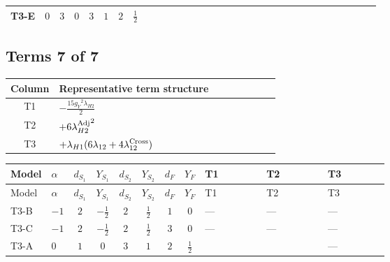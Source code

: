 \documentclass[8pt]{article}
\begin{document}
\begin{landscape}
\begin{longtable}{@{}llcccccc >{\raggedright\arraybackslash}p{0.21\linewidth} >{\raggedright\arraybackslash}p{0.21\linewidth} >{\raggedright\arraybackslash}p{0.21\linewidth}@{}}
\midrule
T3-E & $0$ & $3$ & $0$ & $3$ & $1$ & $2$ & $\frac{1}{2}$ & \scriptsize\adjustbox{max width=\linewidth}{$\begin{gathered} +6 {g_2}^4\end{gathered}$} & \scriptsize\adjustbox{max width=\linewidth}{$\begin{gathered} -\frac{33 {g_2}^2 {\lambda_{H2}}}{2}\end{gathered}$} & \scriptsize\adjustbox{max width=\linewidth}{$\begin{gathered} +3 {g_Y}^4\end{gathered}$} \\
\midrule
\bottomrule
\end{longtable}
\clearpage
\subsection*{Terms 7 of 7}
\begin{center}
\begin{tabular}{@{}c >{\raggedright\arraybackslash}p{0.82\linewidth}@{}}
\toprule
Column & Representative term structure \\
\midrule
T1 & \(\displaystyle -\frac{15 {g_Y}^2 {\lambda_{H2}}}{2}\) \\
\midrule
T2 & \(\displaystyle +6 {\lambda_{H2}^{\rm Adj}}^2\) \\
\midrule
T3 & \(\displaystyle +{\lambda_{H1}} (6 {\lambda_{12}}+4 {\lambda_{12}^{\rm Cross}})\) \\
\midrule
\bottomrule
\end{tabular}
\end{center}
\smallskip
\tiny
\begin{longtable}{@{}llcccccc >{\raggedright\arraybackslash}p{0.21\linewidth} >{\raggedright\arraybackslash}p{0.21\linewidth} >{\raggedright\arraybackslash}p{0.21\linewidth}@{}}
\toprule
Model & $\alpha$ & $d_{S_1}$ & $Y_{S_1}$ & $d_{S_2}$ & $Y_{S_2}$ & $d_F$ & $Y_F$ & T1 & T2 & T3 \\
\midrule
\endfirsthead
\toprule
Model & $\alpha$ & $d_{S_1}$ & $Y_{S_1}$ & $d_{S_2}$ & $Y_{S_2}$ & $d_F$ & $Y_F$ & T1 & T2 & T3 \\
\midrule
\endhead
T3-B & $-1$ & $2$ & $-\frac{1}{2}$ & $2$ & $\frac{1}{2}$ & $1$ & $0$ & --- & --- & --- \\
\midrule
T3-C & $-1$ & $2$ & $-\frac{1}{2}$ & $2$ & $\frac{1}{2}$ & $3$ & $0$ & --- & --- & --- \\
\midrule
T3-A & $0$ & $1$ & $0$ & $3$ & $1$ & $2$ & $\frac{1}{2}$ & \scriptsize\adjustbox{max width=\linewidth}{$\begin{gathered} -\frac{15 {g_Y}^2 {\lambda_{H2}}}{2}\end{gathered}$} & \scriptsize\adjustbox{max width=\linewidth}{$\begin{gathered} +6 {\lambda_{H2}^{\rm Adj}}^2\end{gathered}$} & --- \\

\end{longtable}
\end{landscape}
\end{document}
